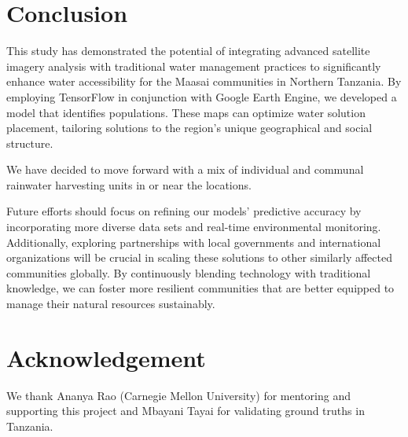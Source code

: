 \documentclass[10pt]{article}
\begin{document}

\section{Conclusion}

This study has demonstrated the potential of integrating advanced satellite imagery analysis with traditional water management practices to significantly enhance water accessibility for the Maasai communities in Northern Tanzania. By employing TensorFlow in conjunction with Google Earth Engine, we developed a model that identifies populations. These maps can optimize water solution placement, tailoring solutions to the region's unique geographical and social structure.

We have decided to move forward with a mix of individual and communal rainwater harvesting units in or near the locations.

Future efforts should focus on refining our models' predictive accuracy by incorporating more diverse data sets and real-time environmental monitoring. Additionally, exploring partnerships with local governments and international organizations will be crucial in scaling these solutions to other similarly affected communities globally. By continuously blending technology with traditional knowledge, we can foster more resilient communities that are better equipped to manage their natural resources sustainably.

\section*{Acknowledgement}

We thank Ananya Rao (Carnegie Mellon University) for mentoring and supporting this project and Mbayani Tayai for validating ground truths in Tanzania.

\printbibliography
\end{document}
